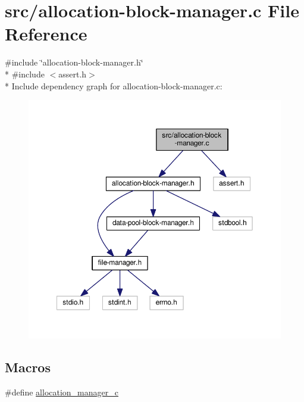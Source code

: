\hypertarget{allocation-block-manager_8c}{\section{src/allocation-\/block-\/manager.c File Reference}
\label{allocation-block-manager_8c}
}
{\ttfamily \#include \char`\"{}allocation-\/block-\/manager.\-h\char`\"{}}\\*
{\ttfamily \#include $<$assert.\-h$>$}\\*
Include dependency graph for allocation-\/block-\/manager.c\-:
\nopagebreak
\begin{figure}[H]
\begin{center}
\leavevmode
\includegraphics[width=350pt]{allocation-block-manager_8c__incl}
\end{center}
\end{figure}
\subsection*{Macros}
\begin{DoxyCompactItemize}
\item 
\#define \hyperlink{allocation-block-manager_8c_a7c27d1e5590b712625952d2abcef87f2}{allocation\-\_\-manager\-\_\-c}
\end{DoxyCompactItemize}
